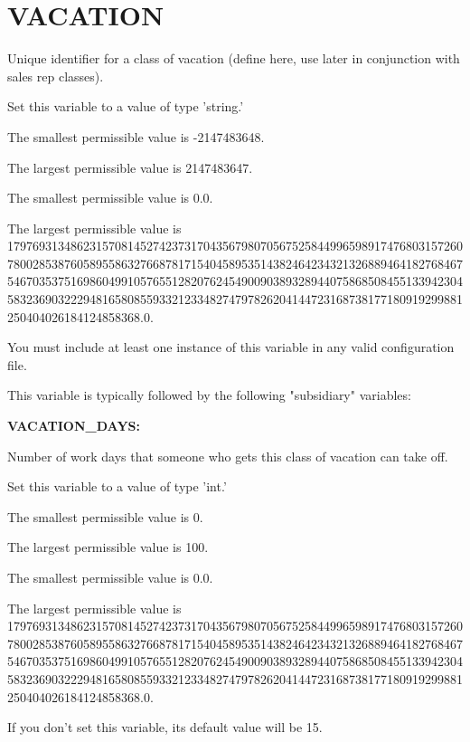 \def\MyPath{/home/idan/confedit/src/schema.tex}
\def\MyTitle{Configuration file syntax}
\def\MyDate{2024-04-20}






\section{VACATION}


Unique identifier for a class of vacation (define here, use later in conjunction with sales rep classes).

Set this variable to a value of type 'string.'

The smallest permissible value is -2147483648.

The largest permissible value is 2147483647.

The smallest permissible value is 0.0.

The largest permissible value is 179769313486231570814527423731704356798070567525844996598917476803157260780028538760589558632766878171540458953514382464234321326889464182768467546703537516986049910576551282076245490090389328944075868508455133942304583236903222948165808559332123348274797826204144723168738177180919299881250404026184124858368.0.

You must include at least one instance of this variable in any valid configuration file.

This variable is typically followed by the following "subsidiary" variables:


\textbf{VACATION\_DAYS:}


Number of work days that someone who gets this class of vacation can take off.

Set this variable to a value of type 'int.'

The smallest permissible value is 0.

The largest permissible value is 100.

The smallest permissible value is 0.0.

The largest permissible value is 179769313486231570814527423731704356798070567525844996598917476803157260780028538760589558632766878171540458953514382464234321326889464182768467546703537516986049910576551282076245490090389328944075868508455133942304583236903222948165808559332123348274797826204144723168738177180919299881250404026184124858368.0.

If you don't set this variable, its default value will be 15.


